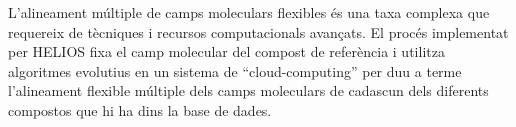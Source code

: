 



L'alineament múltiple de camps moleculars flexibles és una taxa complexa que requereix de tècniques i recursos computacionals avançats. El procés implementat per HELIOS fixa el camp molecular del compost de referència i utilitza algoritmes evolutius en un sistema de ``cloud-computing'' per duu a terme l'alineament flexible múltiple dels camps moleculars de cadascun dels diferents compostos que hi ha dins la base de dades.

